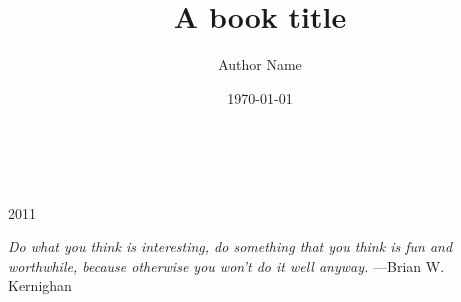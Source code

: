 \documentclass[a5paper,pagesize,10pt,bibtotoc,pointlessnumbers,
normalheadings,DIV=9,twoside=false]{scrbook}
\title{A book title}
\author{Author Name}
\date{\today}
\begin{document}
\tableofcontents
\begin{titlepage}
\\
\vspace{10mm}
\\
\vspace{\fill}
\centering \large{2011}
\end{titlepage}
\newpage{}
\thispagestyle {empty}
\vspace*{2cm}
\begin{center}
\Large{\parbox{10cm}{
\begin{raggedright}
{\Large
\textit{Do what you think is interesting,
do something that you think is fun and worthwhile,
because otherwise you won’t do it well anyway.}
}
\vspace{.5cm}\hfill{---Brian W. Kernighan}
\end{raggedright}
}
}
\end{center}
\newpage
\blinddocument
\begin{comment}
Just some notes, not visible in pdf.
\end{comment}
\end{document}
